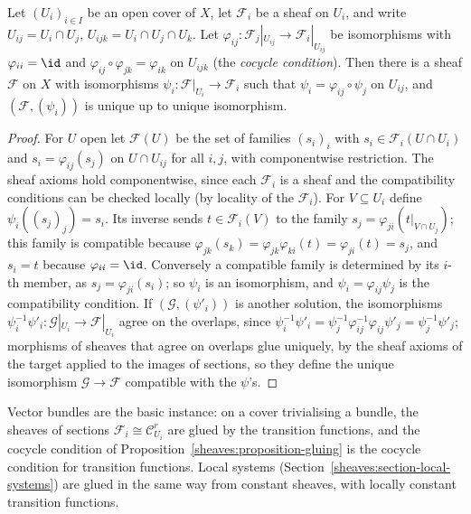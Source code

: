 \begin{proposition}\label{sheaves:proposition-gluing}
Let $(U_i)_{i \in I}$ be an open cover of $X$, let $\mathcal{F}_i$ be a sheaf on $U_i$, and write $U_{ij} = U_i \cap U_j$, $U_{ijk} = U_i \cap U_j \cap U_k$. Let
$\varphi_{ij} \colon \mathcal{F}_j|_{U_{ij}} \to \mathcal{F}_i|_{U_{ij}}$ be isomorphisms with $\varphi_{ii} = \id$ and $\varphi_{ij} \circ \varphi_{jk} = \varphi_{ik}$ on $U_{ijk}$ (the \emph{cocycle condition}). Then there is a sheaf $\mathcal{F}$
on $X$ with isomorphisms $\psi_i \colon \mathcal{F}|_{U_i} \to \mathcal{F}_i$ such that $\psi_i = \varphi_{ij} \circ \psi_j$ on $U_{ij}$, and $(\mathcal{F}, (\psi_i))$ is unique up to unique isomorphism.
\end{proposition}

\begin{proof}
For $U$ open let $\mathcal{F}(U)$ be the set of families $(s_i)_i$ with $s_i \in \mathcal{F}_i(U \cap U_i)$ and $s_i = \varphi_{ij}(s_j)$ on $U \cap U_{ij}$ for all $i, j$, with componentwise restriction. The sheaf
axioms hold componentwise, since each $\mathcal{F}_i$ is a sheaf and the compatibility conditions can be checked locally (by locality of the $\mathcal{F}_i$). For $V \subseteq U_i$ define
$\psi_i(( s_j)_j) = s_i$. Its inverse sends $t \in \mathcal{F}_i(V)$ to the family $s_j = \varphi_{ji}(t|_{V \cap U_j})$; this family is compatible because
$\varphi_{jk}(s_k) = \varphi_{jk}\varphi_{ki}(t) = \varphi_{ji}(t) = s_j$, and $s_i = t$ because $\varphi_{ii} = \id$. Conversely a compatible family is determined by its $i$-th member, as $s_j = \varphi_{ji}(s_i)$; so
$\psi_i$ is an isomorphism, and $\psi_i = \varphi_{ij}\psi_j$ is the compatibility condition. If $(\mathcal{G}, (\psi'_i))$ is another solution, the isomorphisms $\psi_i^{-1}\psi'_i \colon \mathcal{G}|_{U_i} \to \mathcal{F}|_{U_i}$ agree on
the overlaps, since $\psi_i^{-1}\psi'_i = \psi_j^{-1}\varphi_{ij}^{-1}\varphi_{ij}\psi'_j = \psi_j^{-1}\psi'_j$; morphisms of sheaves that agree on overlaps glue uniquely, by the sheaf axioms of the target applied
to the images of sections, so they define the unique isomorphism $\mathcal{G} \to \mathcal{F}$ compatible with the $\psi$'s.
\end{proof}

\begin{example}\label{sheaves:example-gluing}
Vector bundles are the basic instance: on a cover trivialising a bundle, the sheaves of sections $\mathcal{F}_i \cong \mathcal{C}^r_{U_i}$ are glued by the transition functions, and the cocycle condition of
Proposition~\ref{sheaves:proposition-gluing} is the cocycle condition for transition functions. Local systems (Section~\ref{sheaves:section-local-systems}) are glued in the same way from constant sheaves, with locally
constant transition functions.
\end{example}

